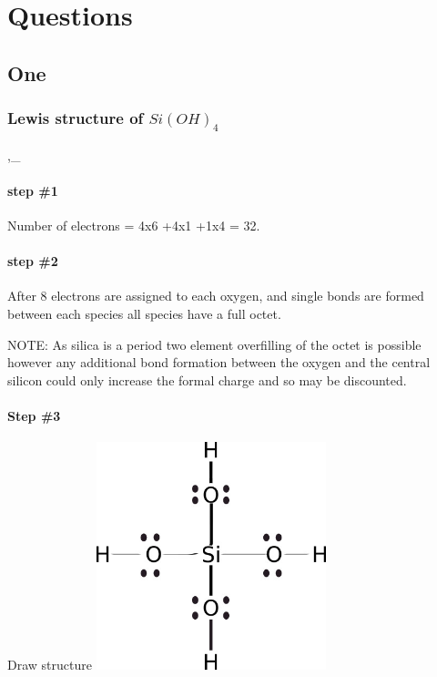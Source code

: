 \documentclass[]{article}
\date{}
\let\oldparagraph\paragraph
\renewcommand{\paragraph}[1]{\oldparagraph{#1}\mbox{}}
\begin{document}
\hypertarget{questions}{%
\section{Questions}\label{questions}}

\hypertarget{one}{%
\subsection{One}\label{one}}

\hypertarget{lewis-structure-of-sioh_4}{%
\subsubsection{\texorpdfstring{Lewis structure of
\(Si(OH)_4\)}{Lewis structure of Si(OH)\_4}}\label{lewis-structure-of-sioh_4}}

,\_

\hypertarget{step-1}{%
\paragraph{step \#1}\label{step-1}}

Number of electrons = 4x6 +4x1 +1x4 = 32.

\hypertarget{step-2}{%
\paragraph{step \#2}\label{step-2}}

After 8 electrons are assigned to each oxygen, and single bonds are
formed between each species all species have a full octet.

NOTE: As silica is a period two element overfilling of the octet is
possible however any additional bond formation between the oxygen and
the central silicon could only increase the formal charge and so may be
discounted.

\hypertarget{step-3}{%
\paragraph{Step \#3}\label{step-3}}

Draw structure
\includegraphics[width=0.5\textwidth,height=\textheight]{Images/SiliconHydroxideLewisStructure.jpg}
\end{document}
